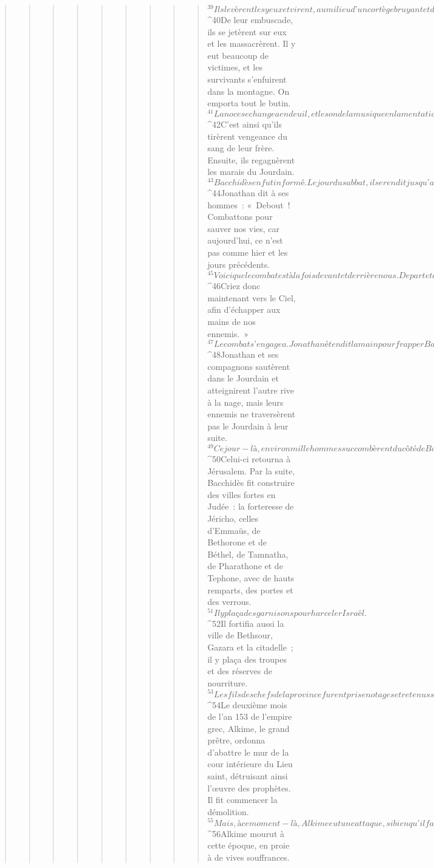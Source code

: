 \begin{verse}
\begin{verse}
\begin{verse}
\begin{verse}
\begin{verse}
\begin{verse}
\begin{verse}
\begin{verse}
\begin{verse}
${}^{39}Ils levèrent les yeux et virent, au milieu d’un cortège bruyant et de tous les bagages, le fiancé, ses amis et ses frères, qui marchaient dans leur direction, avec des tambourins, des instruments de musique et des armes en grand nombre. 
${}^{40}De leur embuscade, ils se jetèrent sur eux et les massacrèrent. Il y eut beaucoup de victimes, et les survivants s’enfuirent dans la montagne. On emporta tout le butin. 
${}^{41}La noce se changea en deuil, et le son de la musique en lamentations. 
${}^{42}C’est ainsi qu’ils tirèrent vengeance du sang de leur frère. Ensuite, ils regagnèrent les marais du Jourdain.
${}^{43}Bacchidès en fut informé. Le jour du sabbat, il se rendit jusqu’aux rives du Jourdain avec une armée nombreuse. 
${}^{44}Jonathan dit à ses hommes : « Debout ! Combattons pour sauver nos vies, car aujourd’hui, ce n’est pas comme hier et les jours précédents. 
${}^{45}Voici que le combat est à la fois devant et derrière nous. De part et d’autre, c’est l’eau du Jourdain, le marais et le fourré : il n’y a pas d’endroit où s’esquiver. 
${}^{46}Criez donc maintenant vers le Ciel, afin d’échapper aux mains de nos ennemis. » 
${}^{47}Le combat s’engagea. Jonathan étendit la main pour frapper Bacchidès, mais celui-ci esquiva le coup en se rejetant en arrière. 
${}^{48}Jonathan et ses compagnons sautèrent dans le Jourdain et atteignirent l’autre rive à la nage, mais leurs ennemis ne traversèrent pas le Jourdain à leur suite. 
${}^{49}Ce jour-là, environ mille hommes succombèrent du côté de Bacchidès.
${}^{50}Celui-ci retourna à Jérusalem. Par la suite, Bacchidès fit construire des villes fortes en Judée : la forteresse de Jéricho, celles d’Emmaüs, de Bethorone et de Béthel, de Tamnatha, de Pharathone et de Tephone, avec de hauts remparts, des portes et des verrous. 
${}^{51}Il y plaça des garnisons pour harceler Israël. 
${}^{52}Il fortifia aussi la ville de Bethsour, Gazara et la citadelle ; il y plaça des troupes et des réserves de nourriture. 
${}^{53}Les fils des chefs de la province furent pris en otages et retenus sous bonne garde dans la citadelle de Jérusalem.
${}^{54}Le deuxième mois de l’an 153 de l’empire grec, Alkime, le grand prêtre, ordonna d’abattre le mur de la cour intérieure du Lieu saint, détruisant ainsi l’œuvre des prophètes. Il fit commencer la démolition. 
${}^{55}Mais, à ce moment-là, Alkime eut une attaque, si bien qu’il fallut interrompre ses travaux. Sa bouche se ferma ; atteint de paralysie, il ne fut plus capable de dire un mot, ni de donner des ordres concernant sa maison. 
${}^{56}Alkime mourut à cette époque, en proie à de vives souffrances. 

\end{verse}
\end{verse}
\end{verse}
\end{verse}
\end{verse}
\end{verse}
\end{verse}
\end{verse}
\end{verse}
